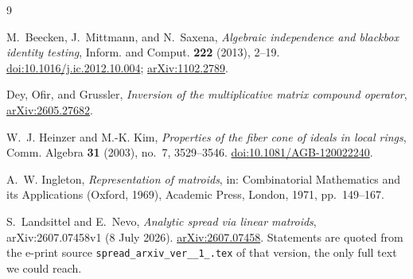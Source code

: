 \documentclass[11pt]{amsart}
\theoremstyle{remark}
\begin{document}
\begin{thebibliography}{9}

M.~Beecken, J.~Mittmann, and N.~Saxena,
\emph{Algebraic independence and blackbox identity testing},
Inform. and Comput. \textbf{222} (2013), 2--19.
\href{https://doi.org/10.1016/j.ic.2012.10.004}{doi:10.1016/j.ic.2012.10.004};
\href{https://arxiv.org/abs/1102.2789}{arXiv:1102.2789}.

Dey, Ofir, and Grussler,
\emph{Inversion of the multiplicative matrix compound operator},
\href{https://arxiv.org/abs/2605.27682}{arXiv:2605.27682}.

W.~J. Heinzer and M.-K. Kim,
\emph{Properties of the fiber cone of ideals in local rings},
Comm. Algebra \textbf{31} (2003), no.~7, 3529--3546.
\href{https://doi.org/10.1081/AGB-120022240}{doi:10.1081/AGB-120022240}.

A.~W. Ingleton,
\emph{Representation of matroids},
in: Combinatorial Mathematics and its Applications (Oxford, 1969),
Academic Press, London, 1971, pp.~149--167.

S.~Landsittel and E.~Nevo,
\emph{Analytic spread via linear matroids},
arXiv:2607.07458v1 (8 July 2026).
\href{https://arxiv.org/abs/2607.07458}{arXiv:2607.07458}.
Statements are quoted from the e-print source
\texttt{spread\_arxiv\_ver\_\_1\_.tex} of that version, the only full text we
could reach.

\end{thebibliography}
\end{document}
